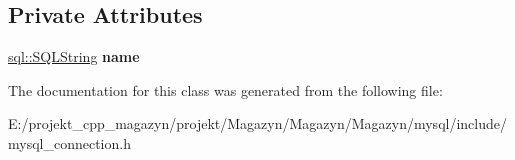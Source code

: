 \subsection*{Private Attributes}
\begin{DoxyCompactItemize}
\item 
\hypertarget{classsql_1_1mysql_1_1_my_s_q_l___savepoint_aa1e58ade85d613b0a7e577470111b6e7}{}\label{classsql_1_1mysql_1_1_my_s_q_l___savepoint_aa1e58ade85d613b0a7e577470111b6e7} 
\hyperlink{classsql_1_1_s_q_l_string}{sql\+::\+S\+Q\+L\+String} {\bfseries name}
\end{DoxyCompactItemize}


The documentation for this class was generated from the following file\+:\begin{DoxyCompactItemize}
\item 
E\+:/projekt\+\_\+cpp\+\_\+magazyn/projekt/\+Magazyn/\+Magazyn/\+Magazyn/mysql/include/mysql\+\_\+connection.\+h\end{DoxyCompactItemize}
